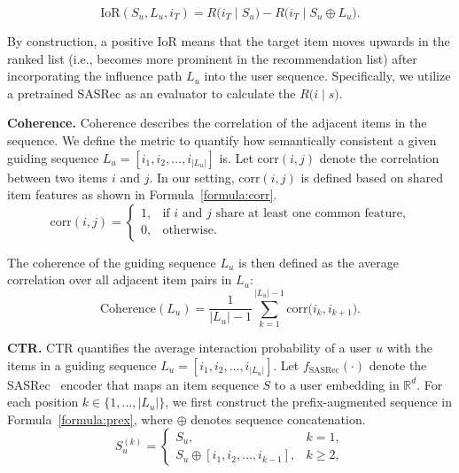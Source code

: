 \documentclass{llmxive}
\begin{document}
\begin{equation}
\mathrm{IoR}(S_u, L_u, i_T)
=
R\bigl(i_T \mid S_u\bigr) - R\bigl(i_T \mid S_u \oplus L_u\bigr)
.
\end{equation}

By construction, a positive IoR means that the target item moves
upwards in the ranked list (i.e., becomes more prominent in the
recommendation list) after incorporating the influence path $L_u$
into the user sequence. Specifically, we utilize a pretrained SASRec as an evaluator to calculate the $R\bigl(i \mid s\bigr)$.

\textbf{Coherence.} Coherence describes the correlation of the adjacent items in the sequence. We define the metric to quantify how semantically consistent a given guiding sequence $L_u = [i_1, i_2, \dots, i_{|L_u|}]$ is. Let $\mathrm{corr}(i,j)$ denote the correlation between two items
$i$ and $j$. In our setting, $\mathrm{corr}(i,j)$ is defined based on shared item features as shown in Formula~\ref{formula:corr}.
\begin{equation}
\mathrm{corr}(i,j) =
\begin{cases}
\label{formula:corr}
1, & \text{if $i$ and $j$ share at least one common feature,} \\
0, & \text{otherwise.}
\end{cases}
\end{equation}

The coherence of the guiding sequence $L_u$ is then defined as the average correlation
over all adjacent item pairs in $L_u$:
\begin{equation}
\mathrm{Coherence}(L_u)
=
\frac{1}{|L_u|-1}
\sum_{k=1}^{|L_u|-1}
\mathrm{corr}\bigl(i_k, i_{k+1}\bigr).
\end{equation}

\textbf{CTR.} CTR quantifies the average interaction probability of a user $u$ with the items in a guiding sequence $L_u = [i_1, i_2, \dots, i_{|L_u|}]$. Let $f_{\mathrm{SASRec}}(\cdot)$ denote the SASRec~\cite{kang2018self} encoder that maps an item sequence $S$ to a user embedding in $\mathbb{R}^d$. For each position $k \in \{1,\dots,|L_u|\}$, we first construct the prefix-augmented sequence in Formula~\ref{formula:prex}, where $\oplus$ denotes sequence concatenation.
\begin{equation}
\label{formula:prex}
S_u^{(k)} =
\begin{cases}
S_u, & k = 1,\\[2pt]
S_u \oplus [i_1, i_2, \dots, i_{k-1}], & k \ge 2,
\end{cases}
\end{equation}
\end{document}
